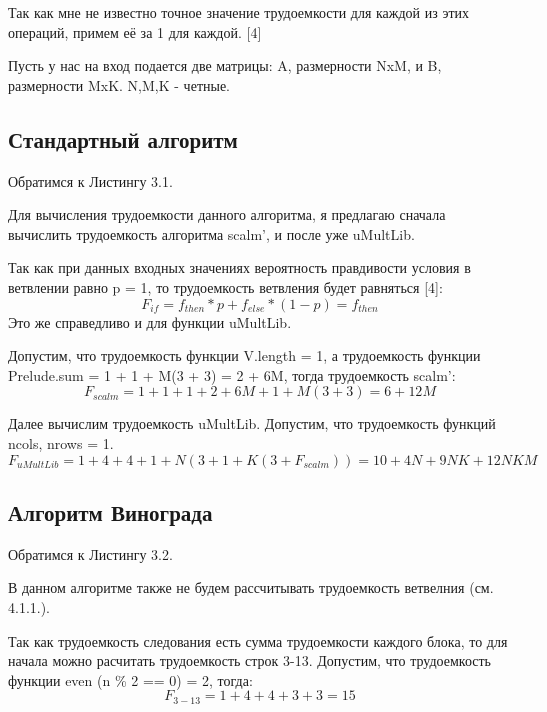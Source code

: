 \documentclass[12pt]{report}
\begin{document}
Так как мне не известно точное значение трудоемкости для каждой из этих операций, примем её за 1 для каждой. [4]

Пусть у нас на вход подается две матрицы: A, размерности NxM, и B, размерности MxK.
N,M,K - четные.

\subsection{Стандартный алгоритм}

Обратимся к Листингу 3.1.

Для вычисления трудоемкости данного алгоритма, я предлагаю сначала вычислить трудоемкость алгоритма scalm', и после уже uMultLib.

Так как при данных входных значениях вероятность правдивости условия в ветвлении равно p = 1, то трудоемкость ветвления будет равняться [4]:
\begin{equation}
	F_{if} = f_{then}*p + f_{else}*(1-p) = f_{then}
\end{equation}
Это же справедливо и для функции uMultLib.

Допустим, что трудоемкость функции V.length = 1, а трудоемкость функции Prelude.sum = 1 + 1 + M(3 + 3) = 2 + 6M, тогда
трудоемкость scalm':
\begin{equation}
	F_{scalm} = 1 + 1 + 1 + 2 + 6M + 1 + M(3 + 3) = 6 + 12M
\end{equation}

Далее вычислим трудоемкость uMultLib.
Допустим, что трудоемкость функций ncols, nrows = 1.
\begin{equation}
	F_{uMultLib} = 1 + 4 + 4 +  1 + N(3 + 1 + K(3 + F_{scalm})) = 10 + 4N + 9NK + 12NKM
\end{equation}

\subsection{Алгоритм Винограда}

Обратимся к Листингу 3.2.

В данном алгоритме также не будем рассчитывать трудоемкость ветвелния (см. 4.1.1.).

Так как трудоемкость следования есть сумма трудоемкости каждого блока, то для начала можно расчитать трудоемкость строк 3-13.
Допустим, что трудоемкость функции even (n \% 2 == 0) = 2, тогда:
\begin{equation}
	F_{3-13} = 1 + 4 + 4 + 3 + 3 = 15
\end{equation}
\end{document}
